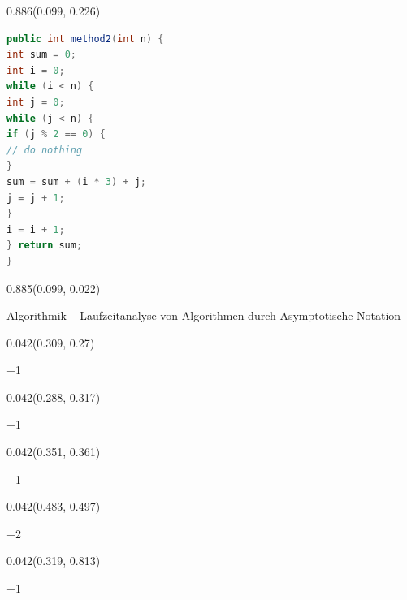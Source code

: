 \documentclass[aspectratio=169]{beamer}
\begin{document}
\begin{frame}[fragile]
\begin{textblock}{0.886}(0.099, 0.226)
  \begin{minipage}[t][0.63\paperheight]{\linewidth}
    {\tiny
    \begin{lstlisting}[language=Java]
public int method2(int n) {
int sum = 0;
int i = 0;
while (i < n) {
int j = 0;
while (j < n) {
if (j % 2 == 0) {
// do nothing
}
sum = sum + (i * 3) + j;
j = j + 1;
}
i = i + 1;
} return sum;
}
    \end{lstlisting}
    }
  \end{minipage}
\end{textblock}

\begin{textblock}{0.885}(0.099, 0.022)
  \begin{minipage}[b][0.031\paperheight]{\linewidth}
    \raggedright
    {\fontsize{3}{3.3}\selectfont Algorithmik – Laufzeitanalyse von Algorithmen durch Asymptotische Notation}
  \end{minipage}
\end{textblock}

\begin{textblock}{0.042}(0.309, 0.27)
  \begin{minipage}[t][0.044\paperheight]{\linewidth}
    +1
  \end{minipage}
\end{textblock}

\begin{textblock}{0.042}(0.288, 0.317)
  \begin{minipage}[t][0.044\paperheight]{\linewidth}
    +1
  \end{minipage}
\end{textblock}

\begin{textblock}{0.042}(0.351, 0.361)
  \begin{minipage}[t][0.044\paperheight]{\linewidth}
    +1
  \end{minipage}
\end{textblock}

\begin{textblock}{0.042}(0.483, 0.497)
  \begin{minipage}[t][0.044\paperheight]{\linewidth}
    +2
  \end{minipage}
\end{textblock}

\begin{textblock}{0.042}(0.319, 0.813)
  \begin{minipage}[t][0.044\paperheight]{\linewidth}
    +1
  \end{minipage}
\end{textblock}


\end{frame}
\end{document}
